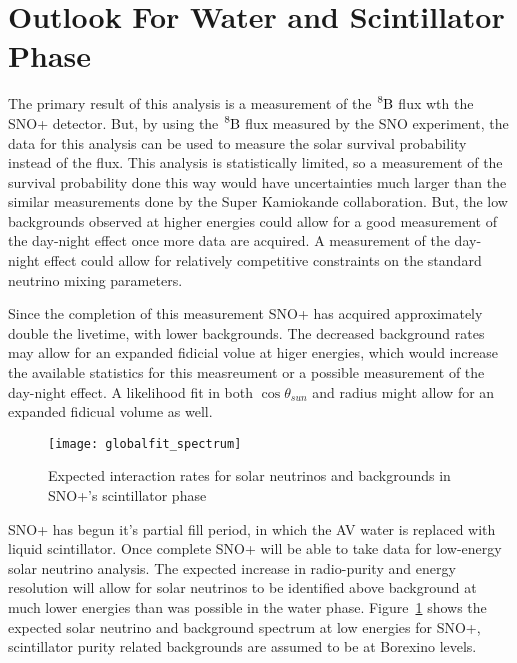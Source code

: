 \section{Outlook For Water and Scintillator Phase}
The primary result of this analysis is a measurement of the $\ce{^{8}B}$
flux wth the SNO+ detector. 
But, by using the $\ce{^{8}B}$ flux measured by the SNO experiment, the data for
this analysis can be used to measure the solar survival probability instead
of the flux.
This analysis is statistically limited, so a measurement of the survival
probability done this way would have uncertainties much larger than the similar
measurements done by the Super Kamiokande collaboration.
But, the low backgrounds observed at higher energies could allow for a good measurement
of the day-night effect once more data are acquired.
A measurement of the day-night effect could allow for relatively
competitive constraints on the standard neutrino mixing parameters.

Since the completion of this measurement SNO+ has acquired approximately double
the livetime, with lower backgrounds.
The decreased background rates may allow for an expanded fidicial volue at
higer energies, which would increase the available statistics for this measreument
or a possible measurement of the day-night effect.
A likelihood fit in both $\cos\theta_{sun}$ and radius might allow for an
expanded fidicual volume as well.

\begin{figure}[htbp]
    \centering
    \texttt{[image: globalfit\_spectrum]}
    \caption[Expected Scintillator Phase SNO+ Solar Neutrino Spectrum]{Expected interaction
    rates for solar neutrinos and backgrounds in SNO+'s scintillator phase}
    \label{fig:snop_scintillator}
\end{figure}
SNO+ has begun it's partial fill
period, in which the AV  water is replaced with liquid scintillator.
Once complete SNO+ will be able to take data for low-energy solar neutrino
analysis.
The expected increase in radio-purity and energy resolution will allow
for solar neutrinos to be identified above background at much lower energies
than was possible in the water phase.
Figure~\ref{fig:snop_scintillator} shows the expected solar neutrino and
background spectrum at low energies for SNO+, scintillator purity related
backgrounds are assumed to be at Borexino levels.

